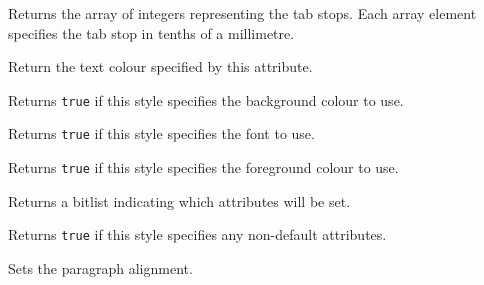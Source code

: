 \label{wxtextattrgettabs}


Returns the array of integers representing the tab stops. Each
array element specifies the tab stop in tenths of a millimetre.


\label{wxtextattrgettextcolour}


Return the text colour specified by this attribute.


\label{wxtextattrhasbackgroundcolour}


Returns {\tt true} if this style specifies the background colour to use.


\label{wxtextattrhasfont}


Returns {\tt true} if this style specifies the font to use.


\label{wxtextattrhastextcolour}


Returns {\tt true} if this style specifies the foreground colour to use.


\label{wxtextattrgetflags}


Returns a bitlist indicating which attributes will be set.


\label{wxtextattrisdefault}


Returns {\tt true} if this style specifies any non-default attributes.


\label{wxtextattrsetalignment}


Sets the paragraph alignment.


\label{wxtextattrsetbackgroundcolour}


